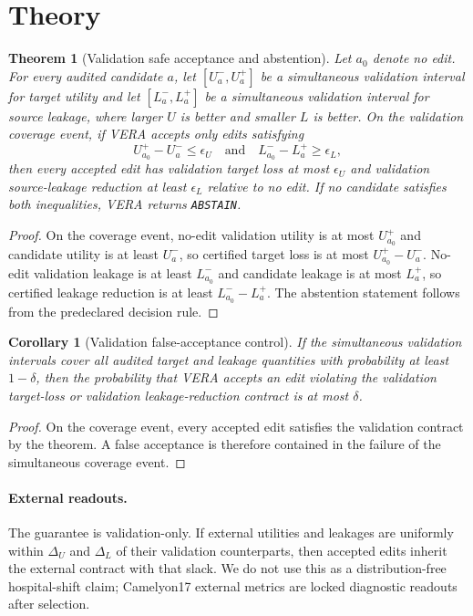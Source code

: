 \documentclass{article}
\newtheorem{theorem}{Theorem}
\newtheorem{corollary}{Corollary}
\begin{document}
\section{Theory}

\begin{theorem}[Validation safe acceptance and abstention]
Let $a_0$ denote no edit. For every audited candidate $a$, let
$[U^-_a,U^+_a]$ be a simultaneous validation interval for target utility and
let $[L^-_a,L^+_a]$ be a simultaneous validation interval for source leakage,
where larger $U$ is better and smaller $L$ is better. On the validation
coverage event, if VERA accepts only edits satisfying
\[
U^+_{a_0}-U^-_a \le \epsilon_U
\quad\textrm{and}\quad
L^-_{a_0}-L^+_a \ge \epsilon_L ,
\]
then every accepted edit has validation target loss at most $\epsilon_U$ and
validation source-leakage reduction at least $\epsilon_L$ relative to no edit.
If no candidate satisfies both inequalities, VERA returns \texttt{ABSTAIN}.
\end{theorem}

\begin{proof}
On the coverage event, no-edit validation utility is at most $U^+_{a_0}$ and
candidate utility is at least $U^-_a$, so certified target loss is at most
$U^+_{a_0}-U^-_a$. No-edit validation leakage is at least $L^-_{a_0}$ and
candidate leakage is at most $L^+_a$, so certified leakage reduction is at
least $L^-_{a_0}-L^+_a$. The abstention statement follows from the
predeclared decision rule.
\end{proof}

\begin{corollary}[Validation false-acceptance control]
If the simultaneous validation intervals cover all audited target and leakage
quantities with probability at least $1-\delta$, then the probability that VERA
accepts an edit violating the validation target-loss or validation
leakage-reduction contract is at most $\delta$.
\end{corollary}

\begin{proof}
On the coverage event, every accepted edit satisfies the validation contract by
the theorem. A false acceptance is therefore contained in the failure of the
simultaneous coverage event.
\end{proof}

\paragraph{External readouts.}
The guarantee is validation-only. If external utilities and leakages are
uniformly within $\Delta_U$ and $\Delta_L$ of their validation counterparts,
then accepted edits inherit the external contract with that slack. We do not
use this as a distribution-free hospital-shift claim; Camelyon17 external
metrics are locked diagnostic readouts after selection.
\end{document}
